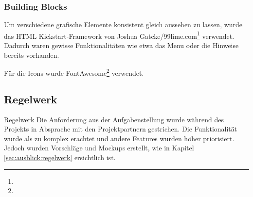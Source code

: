 \subsubsection*{Building Blocks}

Um verschiedene grafische Elemente konsistent gleich aussehen zu lassen, wurde das HTML Kickstart-Framework von Joshua Gatcke/99lime.com\footnote{} verwendet. Dadurch waren gewisse Funktionalitäten wie etwa das Menu oder die Hinweise bereits vorhanden.

Für die Icons wurde FontAwesome\footnote{} verwendet.

\subsection*{Regelwerk}

\begin{decision}{Regelwerk}
Die Anforderung aus der Aufgabenstellung wurde während des Projekts in Absprache mit den Projektpartnern gestrichen. Die Funktionalität wurde als zu komplex erachtet und andere Features wurden höher priorisiert. Jedoch wurden Vorschläge und Mockups erstellt, wie in Kapitel \ref{sec:ausblick:regelwerk} ersichtlich ist.
\end{decision}
